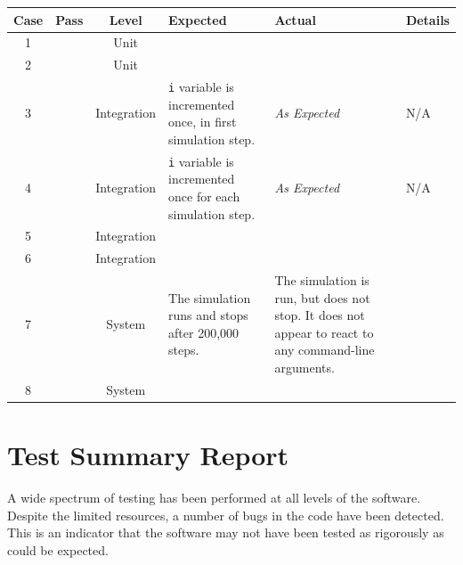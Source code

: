 \documentclass[11pt]{article}
\newcommand{\cmark}{\ding{51}}%
\begin{document}
\begin{adjustbox}{center}
\begin{tabular}{|c|c|c|p{10em}|p{10em}|p{10em}|}
	\hline
	\textbf{Case} & \textbf{Pass} & \textbf{Level} & \textbf{Expected} & \textbf{Actual} & \multicolumn{1}{c|}{\textbf{Details}} \\
	\hline
	1 & \textcolor{pass_grn}{\cmark} & Unit &  &  & \\
	\hline
	2 & \textcolor{pass_grn}{\cmark} & Unit &  &  & \\
	\hline
	3 & \textcolor{pass_grn}{\cmark} & Integration & \texttt{i} variable is incremented once, in first simulation step. & \textit{As Expected} & N/A\\
	\hline
	4 & \textcolor{pass_grn}{\cmark} & Integration & \texttt{i} variable is incremented once for each simulation step. & \textit{As Expected} & N/A \\
	\hline
	5 & \textcolor{pass_grn}{\cmark} & Integration &  & & \\
	\hline
	6 & \textcolor{pass_grn}{\cmark} & Integration &  &  &  \\
	\hline
	7 & \textcolor{fail_red}{\cmark} & System & The simulation runs and stops after 200,000 steps. & The simulation is run, but does not stop. It does not appear to react to any command-line arguments. & \\
	\hline
	8 & \textcolor{pass_grn}{\cmark} & System &&& \\
	\hline
\end{tabular}
\end{adjustbox}

\newpage
\section{Test Summary Report}%
A wide spectrum of testing has been performed at all levels of the software.
\\

Despite the limited resources, a number of bugs in the code have been detected.
This is an indicator that the software may not have been tested as rigorously as could be expected.
\end{document}
